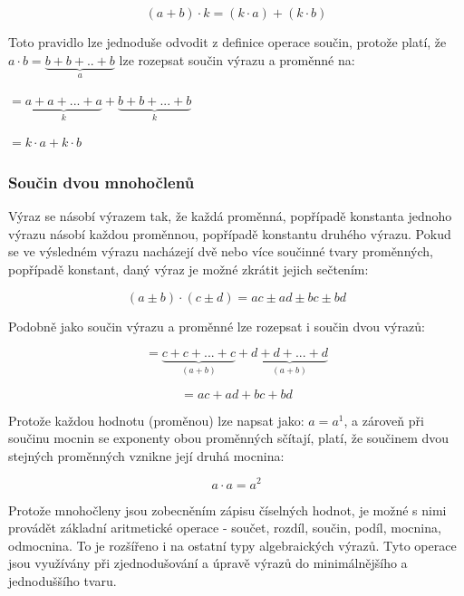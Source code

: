 \documentclass[11pt]{article}
\begin{document}
$$ (a + b) \cdot k = (k\cdot a) + (k \cdot b) $$

Toto pravidlo lze jednoduše odvodit z definice operace součin, protože platí, že $a \cdot b = \underbrace{b + b +.. +b}_a$ lze rozepsat součin výrazu a proměnné na:

\begin{center}

\par
$=\underbrace{a + a + ... +a}_k + \underbrace{b + b +...+b}_k$
\par
$ = k\cdot a + k\cdot b $

\end{center}



\subsubsection{Součin dvou mnohočlenů}

Výraz se násobí výrazem tak, že každá proměnná, popřípadě konstanta jednoho výrazu násobí každou proměnnou, popřípadě konstantu druhého výrazu. Pokud se ve výsledném výrazu nacházejí dvě nebo více součinné tvary proměnných, popřípadě konstant, daný výraz je možné zkrátit jejich sečtením:

$$ (a \pm b) \cdot (c \pm d) = ac \pm ad \pm bc \pm bd $$

Podobně jako součin výrazu a proměnné lze rozepsat i součin dvou výrazů:

\begin{center}

$$ = \underbrace{c + c + ...+c}_{(a + b)} + \underbrace{d + d + ... +d }_{(a + b)} $$


$$ = ac + ad + bc + bd $$
\end{center}

Protože každou hodnotu (proměnou) lze napsat jako: $a = a^1$, a zároveň při součinu mocnin se exponenty obou proměnných sčítají, platí, že součinem dvou stejných proměnných vznikne její druhá mocnina:

$$ a\cdot a = a^2 $$

Protože mnohočleny jsou zobecněním zápisu číselných hodnot, je možné s nimi provádět základní aritmetické operace - součet, rozdíl, součin, podíl, mocnina, odmocnina. To je rozšířeno i na ostatní typy algebraických výrazů. Tyto operace jsou využívány při zjednodušování a úpravě výrazů do minimálnějšího a jednoduššího tvaru.
\end{document}
